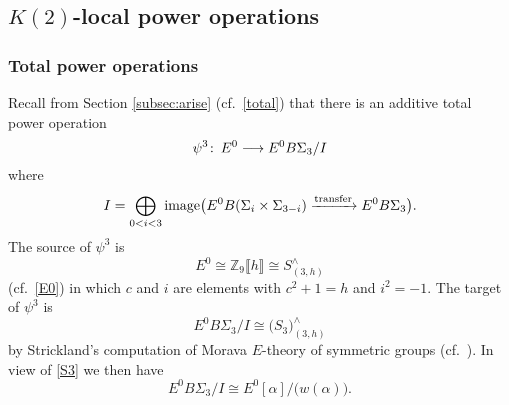 \documentclass{gtpart}
\theoremstyle{definition}
\theoremstyle{remark}
\def\co{\colon\thinspace}
\newcommand{\mb}[1]{\mathbb{#1}}
\newcommand{\BZ}{{\mb Z}}
\newcommand{\A}{\alpha}
\newcommand{\p}{\psi^3}
\numberwithin{equation}{section}
\numberwithin{thm}{section}
\begin{document}
\subsection{$K(2)$-local power operations}
\label{subsec:K(2)po}

\subsubsection*{Total power operations}

Recall from Section \ref{subsec:arise} (cf.~\eqref{total}) that there is 
an additive total power operation 
\[
 \p \co E^0 \longrightarrow E^0 B\Sigma_3 / I 
\]
where 
\[
 I = \bigoplus_{0<i<3} {\rm image} 
 \big( E^0 B(\Sigma_i \times \Sigma_{3-i}) 
 \xrightarrow{\rm transfer} E^0 B\Sigma_3 \big).  
\]
The source of $\p$ is 
\[
 E^0 \cong \BZ_9 \llbracket h \rrbracket \cong S_{(3,h)}^\wedge 
\]
(cf.~\eqref{E0}) in which $c$ and $i$ are elements with $c^2 + 1 = h$ 
and $i^2 = -1$.  The target of $\p$ is 
\begin{equation}
\label{strickland}
 E^0 B\Sigma_3 / I \cong \big( S_3 \big)_{(3,h)}^\wedge 
\end{equation}
by Strickland's computation of Morava $E$-theory of symmetric groups 
(cf.~\cite[Theorem 1.1]{Str98}).  In view of \eqref{S3} we then have 
\begin{equation}
\label{strickland'}
 E^0 B\Sigma_3 / I \cong E^0 [\A] \big/ \big( w(\A) \big).  
\end{equation}
\end{document}
